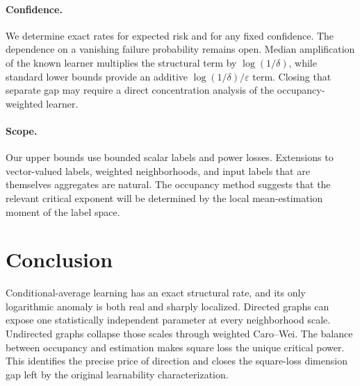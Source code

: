 \documentclass{article}
\theoremstyle{definition}
\theoremstyle{remark}
\begin{document}
\paragraph{Confidence.} We determine exact rates for expected risk and for any fixed confidence. The dependence on a vanishing failure probability remains open. Median amplification of the known learner multiplies the structural term by $\log(1/\delta)$, while standard lower bounds provide an additive $\log(1/\delta)/\varepsilon$ term. Closing that separate gap may require a direct concentration analysis of the occupancy-weighted learner.

\paragraph{Scope.} Our upper bounds use bounded scalar labels and power losses. Extensions to vector-valued labels, weighted neighborhoods, and input labels that are themselves aggregates are natural. The occupancy method suggests that the relevant critical exponent will be determined by the local mean-estimation moment of the label space.

\section{Conclusion}

Conditional-average learning has an exact structural rate, and its only logarithmic anomaly is both real and sharply localized. Directed graphs can expose one statistically independent parameter at every neighborhood scale. Undirected graphs collapse those scales through weighted Caro--Wei. The balance between occupancy and estimation makes square loss the unique critical power. This identifies the precise price of direction and closes the square-loss dimension gap left by the original learnability characterization.




\appendix

\end{document}
